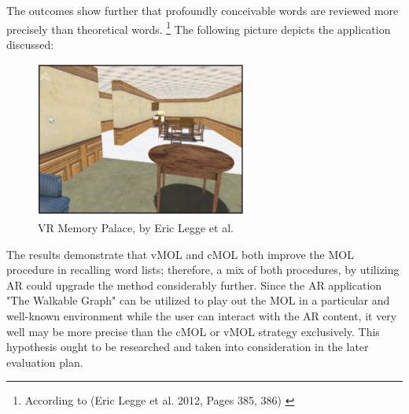 \documentclass[12pt,a4paper,oneside,american,parskip=half]{article}
\begin{document}
\begin{justify}
\begin{normalsize}
The outcomes show further that profoundly conceivable words are reviewed more precisely than theoretical words. \footnote{According to (Eric Legge et al. 2012, Pages 385, 386) \cite{mempalace}} 
\newline
The following picture depicts the application discussed:
\begin{figure}[h!]
\centering
\includegraphics[width=7cm]{mempalace.png}
\caption{VR Memory Palace, by Eric Legge et al. \cite{mempalace}}
\end{figure}
\newline
The results demonstrate that vMOL and cMOL both improve the MOL procedure in recalling word lists; therefore, a mix of both procedures, by utilizing AR could upgrade the method considerably further. Since the AR application "The Walkable Graph" can be utilized to play out the MOL in a particular and well-known environment while the user can interact with the AR content, it very well may be more precise than the cMOL or vMOL strategy exclusively. This hypothesis ought to be researched and taken into consideration in the later evaluation plan.


\end{normalsize}
\end{justify}
\end{document}
